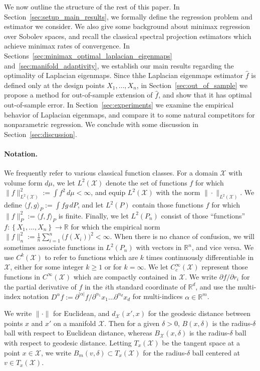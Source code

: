 \documentclass{article}
\newcommand{\Reals}{\mathbb{R}}
\newcommand{\set}[1]{\left\{#1\right\}}
\newcommand{\1}{\mathbf{1}}
\newcommand{\Rd}{\Reals^d}
\newcommand{\mc}[1]{\mathcal{#1}}
\newcommand{\dotp}[2]{\langle #1, #2 \rangle}
\newcommand{\wh}[1]{\widehat{#1}}
\theoremstyle{alden}
\theoremstyle{aldenthm}
\theoremstyle{definition}
\theoremstyle{remark}
\begin{document}
We now outline the structure of the rest of this paper. In Section~\ref{sec:setup_main_results}, we formally define the regression problem and estimator we consider. We also give some background about minimax regression over Sobolev spaces, and recall the classical spectral projection estimators which achieve minimax rates of convergence. In Sections~\ref{sec:minimax_optimal_laplacian_eigenmaps} and~\ref{sec:manifold_adaptivity}, we establish our main results regarding the optimality of Laplacian eigenmaps. Since thhe Laplacian eigenmaps estimator $\wh{f}$ is defined only at the design points $X_1,\ldots,X_n$, in Section~\ref{sec:out_of_sample} we propose a method for out-of-sample extension of $\wh{f}$, and show that it has optimal out-of-sample error. In Section~\ref{sec:experiments} we examine the empirical behavior of Laplacian eigenmaps, and compare it to some natural competitors for nonparametric regression. We conclude with some discussion in Section~\ref{sec:discussion}.

\paragraph{Notation.}
We frequently refer to various classical function classes. For a domain $\mc{X}$ with volume form $d\mu$, we let $L^2(\mc{X})$ denote the set of functions $f$ for which $\|f\|_{L^2(\mc{X})}^2 := \int f^2 \,d\mu  < \infty$, and equip $L^2(\mc{X})$ with the norm $\|\cdot\|_{L^2(\mc{X})}$. We define $\dotp{f}{g}_P := \int fg\,dP$, and let $L^2(P)$ contain those functions $f$ for which $\|f\|_P^2 := \dotp{f}{f}_P$ is finite. Finally, we let $L^2(P_n)$ consist of those ``functions'' $f: \set{X_1,\ldots,X_n} \to \Reals$ for which the empirical norm $\|f\|_{n}^2 := \frac{1}{n}\sum_{i = 1}^{n} \bigl(f(X_i)\bigr)^2 < \infty$. When there is no chance of confusion, we will sometimes associate functions in $L^2(P_n)$ with vectors in $\Reals^n$, and vice versa. We use $C^k(\mc{X})$ to refer to functions which are $k$ times continuously differentiable in $\mc{X}$, either for some integer $k \geq 1$ or for $k = \infty$. We let $C_c^{\infty}(\mc{X})$ represent those functions in $C^{\infty}(\mc{X})$ which are compactly contained in $\mc{X}$. We write $\partial f/\partial r_i$ for the partial derivative of $f$ in the $i$th standard coordinate of $\Rd$, and use the multi-index notation $D^{\alpha}f := \partial^{|\alpha|}f/\partial^{\alpha_1}x_1\ldots\partial^{\alpha_d}x_d$ for multi-indices $\alpha \in \Reals^m$.

We write $\|\cdot\|$ for Euclidean, and $d_{\mc{X}}(x',x)$ for the geodesic distance between points $x$ and $x'$ on a manifold $\mc{X}$. Then for a given $\delta > 0$, $B(x,\delta)$ is the radius-$\delta$ ball with respect to Euclidean distance, whereas $B_{\mc{X}}(x,\delta)$ is the radius-$\delta$ ball with respect to geodesic distance. Letting $T_x(\mc{X})$ be the tangent space at a point $x \in \mc{X}$, we write $B_m(v,\delta) \subset T_x(\mc{X})$ for the radius-$\delta$ ball centered at $v \in T_x(\mc{X})$.
\end{document}
